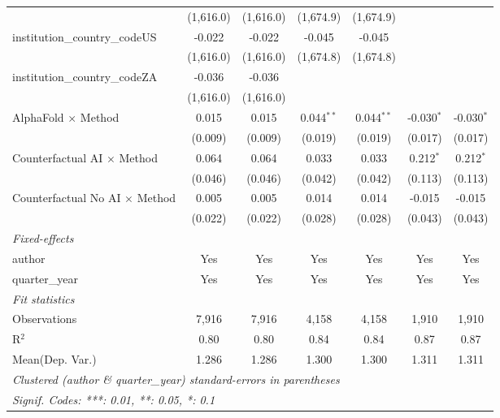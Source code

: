 \begin{tabular}{lcccccc}
                                         & (1,616.0)      & (1,616.0)      & (1,674.9)     & (1,674.9)     &              &   \\   
   institution\_country\_codeUS          & -0.022         & -0.022         & -0.045        & -0.045        &              &   \\   
                                         & (1,616.0)      & (1,616.0)      & (1,674.8)     & (1,674.8)     &              &   \\   
   institution\_country\_codeZA          & -0.036         & -0.036         &               &               &              &   \\   
                                         & (1,616.0)      & (1,616.0)      &               &               &              &   \\   
   AlphaFold $\times$ Method             & 0.015          & 0.015          & 0.044$^{**}$  & 0.044$^{**}$  & -0.030$^{*}$ & -0.030$^{*}$\\   
                                         & (0.009)        & (0.009)        & (0.019)       & (0.019)       & (0.017)      & (0.017)\\   
   Counterfactual AI $\times$ Method     & 0.064          & 0.064          & 0.033         & 0.033         & 0.212$^{*}$  & 0.212$^{*}$\\   
                                         & (0.046)        & (0.046)        & (0.042)       & (0.042)       & (0.113)      & (0.113)\\   
   Counterfactual No AI $\times$ Method  & 0.005          & 0.005          & 0.014         & 0.014         & -0.015       & -0.015\\   
                                         & (0.022)        & (0.022)        & (0.028)       & (0.028)       & (0.043)      & (0.043)\\   
   \midrule
   \emph{Fixed-effects}\\
   author                                & Yes            & Yes            & Yes           & Yes           & Yes          & Yes\\  
   quarter\_year                         & Yes            & Yes            & Yes           & Yes           & Yes          & Yes\\  
   \midrule
   \emph{Fit statistics}\\
   Observations                          & 7,916          & 7,916          & 4,158         & 4,158         & 1,910        & 1,910\\  
   R$^2$                                 & 0.80           & 0.80           & 0.84          & 0.84          & 0.87         & 0.87\\  
Mean(Dep. Var.) & 1.286 & 1.286 & 1.300 & 1.300 & 1.311 & 1.311 \\
   \midrule \midrule
   \multicolumn{7}{l}{\emph{Clustered (author \& quarter\_year) standard-errors in parentheses}}\\
   \multicolumn{7}{l}{\emph{Signif. Codes: ***: 0.01, **: 0.05, *: 0.1}}\\
\end{tabular}
\par\endgroup
